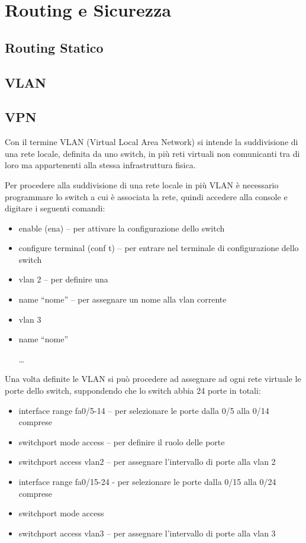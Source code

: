 \section{Routing e Sicurezza}
\subsection{Routing Statico}
\subsection{VLAN}
\subsection{VPN}
Con il termine VLAN (Virtual Local Area Network) si intende la suddivisione di una rete locale, definita da uno switch, in più reti virtuali non comunicanti tra di loro ma appartenenti alla stessa infrastruttura fisica.

Per procedere alla suddivisione di una rete locale in più VLAN è necessario programmare lo switch a cui è associata la rete, quindi accedere alla console e digitare i seguenti comandi:

\begin{itemize}
    \item enable (ena) – per attivare la configurazione dello switch 
    \item configure terminal (conf t) – per entrare nel terminale di configurazione dello switch 
    \item vlan 2 – per definire una 
    \item name “nome” – per assegnare un nome alla vlan corrente 
    \item vlan 3
    \item name “nome”
    \item […]
\end{itemize}

Una volta definite le VLAN si può procedere ad assegnare ad ogni rete virtuale le porte dello switch, suppondendo che lo switch abbia 24 porte in totali:

\begin{itemize}
    \item interface range fa0/5-14 – per selezionare le porte dalla 0/5 alla 0/14 comprese
    \item switchport mode access – per definire il ruolo delle porte
    \item switchport access vlan2 – per assegnare l’intervallo di porte alla vlan 2
    \item interface range fa0/15-24 - per selezionare le porte dalla 0/15 alla 0/24 comprese
    \item switchport mode access
    \item switchport access vlan3 – per assegnare l’intervallo di porte alla vlan 3
\end{itemize}

